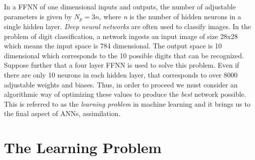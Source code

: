 In a FFNN of one dimensional inputs and outputs, the number of adjustable parameters is given by $N_p=3n$, where \textit{n} is the number of hidden neurons in a single hidden layer. \textit{Deep neural networks} are often used to classify images. In the problem of digit classification, a network ingests an input image of size 28x28 which means the input space is 784 dimensional. The output space is 10 dimensional which corresponds to the 10 possible digits that can be recognized. Suppose further that a four layer FFNN is used to solve this problem. Even if there are only 10 neurons in each hidden layer, that corresponds to over 8000 adjustable weights and biases. Thus, in order to proceed we must consider an algorithmic way of optimizing these values to produce the \textit{best} network possible. This is referred to as the \textit{learning problem} in machine learning and it brings us to the final aspect of ANNs, assimilation.

\section{The Learning Problem} \label{learning_problem}

